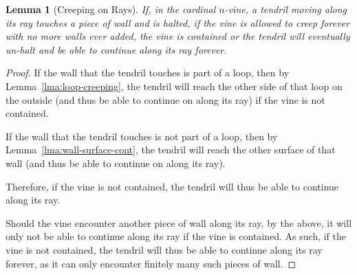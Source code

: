 \documentclass[12pt]{article}
\theoremstyle{plain}
\newtheorem{lemma}[theorem]{Lemma}
\theoremstyle{definition}
\begin{document}
\begin{lemma}[Creeping on Rays]
\label{lma:creeping-rays}
If, in the cardinal \(n\)-vine, a tendril moving along its ray touches a piece of wall and is halted, if the vine is allowed to creep forever with no more walls ever added, the vine is contained or the tendril will eventually un-halt and be able to continue along its ray forever. 
\end{lemma}
\begin{proof}[Proof]
If the wall that the tendril touches is part of a loop, then by Lemma~\ref{lma:loop-creeping}, the tendril will reach the other side of that loop on the outside (and thus be able to continue on along its ray) if the vine is not contained. 

If the wall that the tendril touches is not part of a loop, then by Lemma~\ref{lma:wall-surface-cont}, the tendril will reach the other surface of that wall (and thus be able to continue on along its ray). 

Therefore, if the vine is not contained, the tendril will thus be able to continue along its ray.

Should the vine encounter another piece of wall along its ray, by the above, it will only not be able to continue along its ray if the vine is contained. As such, if the vine is not contained, the tendril will thus be able to continue along its ray forever, as it can only encounter finitely many such pieces of wall. 
\end{proof}
\end{document}
